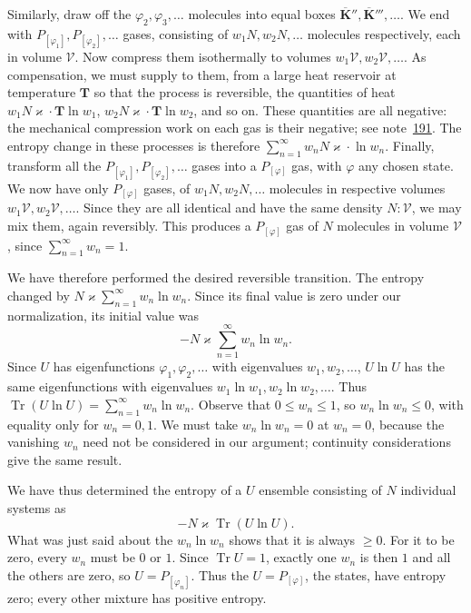 \documentclass[fontsize=13pt,twoside,openany,headings=normal,parskip=false,bookmarkpackage=false,DIV=calc]{scrbook}
\begin{document}
Similarly, draw off the $\varphi_2,\varphi_3,\ldots$ molecules into equal boxes $\overline{\boldsymbol{K}}'',\overline{\boldsymbol{K}}''',\ldots$. We end with $P_{[\varphi_1]},P_{[\varphi_2]},\ldots$ gases, consisting of $w_1N,w_2N,\ldots$ molecules respectively, each in volume $\mathcal V$. Now compress them isothermally to volumes $w_1\mathcal V,w_2\mathcal V,\ldots$. As compensation, we must supply to them, from a large heat reservoir at temperature $\mathbf T$ so that the process is reversible, the quantities of heat $w_1N\varkappa\cdot\mathbf T\ln w_1$, $w_2N\varkappa\cdot\mathbf T\ln w_2$, and so on. These quantities are all negative: the mechanical compression work on each gas is their negative; see note~\hyperlink{note-191}{191}. The entropy change in these processes is therefore $\sum_{n=1}^{\infty}w_nN\varkappa\cdot\ln w_n$. Finally, transform all the $P_{[\varphi_1]},P_{[\varphi_2]},\ldots$ gases into a $P_{[\varphi]}$ gas, with $\varphi$ any chosen state. We now have only $P_{[\varphi]}$ gases, of $w_1N,w_2N,\ldots$ molecules in respective volumes $w_1\mathcal V,w_2\mathcal V,\ldots$. Since they are all identical and have the same density $N:\mathcal V$, we may mix them, again reversibly. This produces a $P_{[\varphi]}$ gas of $N$ molecules in volume $\mathcal V$, since $\sum_{n=1}^{\infty}w_n=1$.

We have therefore performed the desired reversible transition. The entropy changed by $N\varkappa\sum_{n=1}^{\infty}w_n\ln w_n$. Since its final value is zero under our normalization, its initial value was
\[
-N\varkappa\sum_{n=1}^{\infty}w_n\ln w_n.
\]
Since $U$ has eigenfunctions $\varphi_1,\varphi_2,\ldots$ with eigenvalues $w_1,w_2,\ldots$, $U\ln U$ has the same eigenfunctions with eigenvalues $w_1\ln w_1,w_2\ln w_2,\ldots$. Thus $\operatorname{Tr}(U\ln U)=\sum_{n=1}^{\infty}w_n\ln w_n$. Observe that $0\leq w_n\leq1$, so $w_n\ln w_n\leq0$, with equality only for $w_n=0,1$. We must take $w_n\ln w_n=0$ at $w_n=0$, because the vanishing $w_n$ need not be considered in our argument; continuity considerations give the same result.

\hypertarget{origpage-202}{}%
We have thus determined the entropy of a $U$ ensemble consisting of $N$ individual systems as
\[
-N\varkappa\operatorname{Tr}(U\ln U).
\]
What was just said about the $w_n\ln w_n$ shows that it is always $\geq0$. For it to be zero, every $w_n$ must be $0$ or $1$. Since $\operatorname{Tr}U=1$, exactly one $w_n$ is then $1$ and all the others are zero, so $U=P_{[\varphi_n]}$. Thus the $U=P_{[\varphi]}$, the states, have entropy zero; every other mixture has positive entropy.
\end{document}
